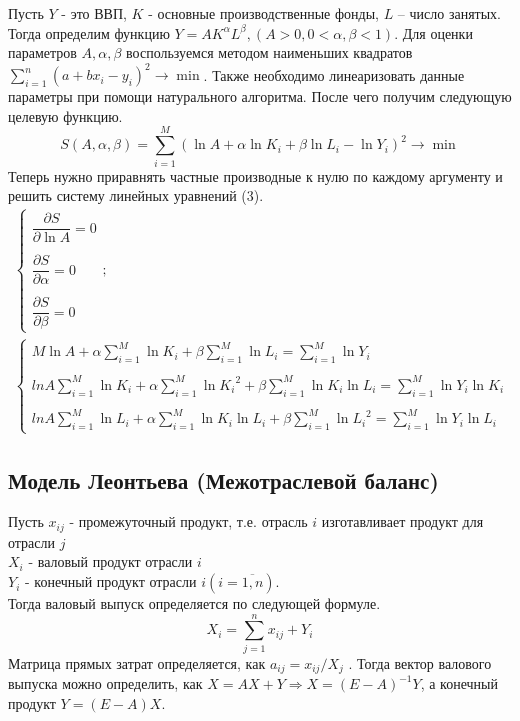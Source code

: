 Пусть $Y$ - это ВВП, $K$ - основные производственные фонды, $L$ – число занятых.
 Тогда определим функцию $Y=AK^{\alpha} L^{\beta},(A>0,0<\alpha,\beta<1)$.
Для оценки параметров $A,\alpha,\beta$ воспользуемся методом наименьших квадратов $\sum_{i=1}^n(a+b x_i-y_i )^2\to\min$. Также необходимо линеаризовать данные параметры при помощи натурального алгоритма. После чего получим следующую целевую функцию.
\begin{equation}
  S(A,\alpha,\beta)=\sum_{i=1}^M (\ln{A}+\alpha\ln{K_i}+\beta\ln{L_i}-\ln{Y_i})^2 \to\min
\end{equation}
Теперь нужно приравнять частные производные к нулю по каждому аргументу и решить систему линейных уравнений (3).
\begin{gather}
  \begin{cases}
  \dfrac{\partial S}{\partial \ln{A}}=0\\\\
  \dfrac{\partial S}{\partial \alpha}=0\\\\
  \dfrac{\partial S}{\partial \beta}=0
\end{cases};\\
\begin{cases}
  M\ln{A}+\alpha \sum_{i=1}^M\ln{K_i}+\beta \sum_{i=1}^M\ln{L_i}=\sum_{i=1}^M\ln{Y_i}\\\\
  ln{A}\sum_{i=1}^M\ln{K_i}+\alpha \sum_{i=1}^M\ln{K_i}^2+\beta\sum_{i=1}^M\ln{K_i}\ln{L_i}=\sum_{i=1}^M\ln{Y_i}\ln{K_i}\\\\
  ln{A}\sum_{i=1}^M\ln{L_i}+\alpha \sum_{i=1}^M\ln{K_i}\ln{L_i}+\beta\sum_{i=1}^M\ln{L_i}^2=\sum_{i=1}^M\ln{Y_i}\ln{L_i}
  \end{cases}
\end{gather}

\subsection{Модель Леонтьева (Межотраслевой баланс)}
Пусть $x_{ij}$ - промежуточный продукт, т.е. отрасль $i$ изготавливает продукт для отрасли $j$\\
$X_i$ - валовый продукт отрасли $i$\\
$Y_i$ - конечный продукт отрасли $i (i=\overline{1,n})$.\\
Тогда валовый выпуск определяется по следующей формуле.
\begin{equation}
X_i=\sum_{j=1}^nx_{ij}+Y_i
\end{equation}
Матрица прямых затрат определяется, как $a_{ij}=x_{ij}/X_j$ . Тогда вектор валового выпуска можно определить,
 как $X=AX+Y\Rightarrow X=(E-A)^{-1} Y$, а конечный продукт $Y=(E-A)X$.


